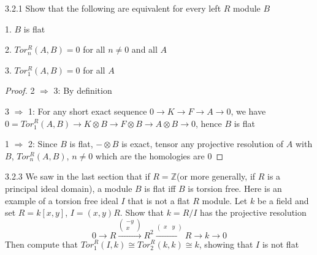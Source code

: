 \documentclass[../main.tex]{subfiles}
\begin{document}
\begin{customexercise}{3.2.1}
Show that the following are equivalent for every left $R$ module $B$ \par
1. $B$ is flat \par
2. $Tor_n^R(A,B)=0$ for all $n\neq0$ and all $A$ \par
3. $Tor_1^R(A,B)=0$ for all $A$ \par
\end{customexercise}

\begin{proof}
2 $\Rightarrow$ 3: By definition \par
3 $\Rightarrow$ 1: For any short exact sequence $0\to K\to F\to A\to0$, we have $0=Tor^R_1(A,B)\to K\otimes B\to F\otimes B\to A\otimes B\to0$, hence $B$ is flat \par
1 $\Rightarrow$ 2: Since $B$ is flat, $-\otimes B$ is exact, tensor any projective resolution of $A$ with $B$, $Tor^R_n(A,B)$, $n\neq0$ which are the homologies are $0$
\end{proof}

\begin{customexercise}{3.2.3}
We saw in the last section that if $R=\mathbb Z$(or more generally, if $R$ is a principal ideal domain), a module $B$ is flat iff $B$ is torsion free. Here is an example of a torsion free ideal $I$ that is not a flat $R$ module. Let $k$ be a field and set $R=k[x,y]$, $I=(x,y)R$. Show that $k=R/I$ has the projective resolution
\[0\to R\xrightarrow{\begin{pmatrix}
-y\\
x
\end{pmatrix}}R^2\xrightarrow{\begin{pmatrix}
x&y
\end{pmatrix}}R\to k\to0\]
Then compute that $Tor_1^R(I,k)\cong Tor_2^R(k,k)\cong k$, showing that $I$ is not flat
\end{customexercise}
\end{document}
